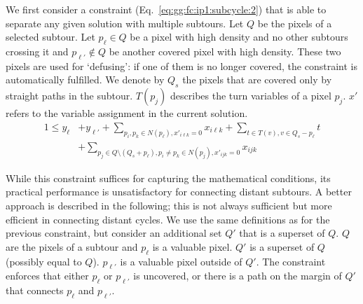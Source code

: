 We first consider a constraint (Eq.~\ref{eq:gg:fc:ip1:subcycle:2}) that is able to separate any given solution with multiple subtours.
Let $Q$ be the pixels of a selected subtour. 
Let $p_\ell\in Q$ be a pixel with high density and no other subtours crossing it
and $p_{\ell'}\not\in Q$ be another covered pixel with high density.
These two pixels are used for `defusing': if one of them is no longer covered, the constraint is automatically fulfilled.
We denote by $Q_s$ the pixels that are covered only by straight paths in the subtour.
$T(p_j)$ describes the turn variables of a pixel $p_j$.
$x'$ refers to the variable assignment in the current solution.
\begin{align}
	1 \leq y_{\ell} &+y_{\ell'}+\sum_{p_i,p_k\in N(p_\ell), x'_{i\ell k}=0} x_{i\ell k}  + \sum_{t\in T(v), v\in Q_s-p_\ell} t \nonumber \\
	   & + \sum_{ p_j\in Q\setminus (Q_s+p_\ell), p_i\not=p_k\in N(p_j), x'_{ijk}=0} x_{ijk} \label{eq:gg:fc:ip1:subcycle:2}
\end{align}


While this constraint suffices for capturing the mathematical conditions, its practical performance is unsatisfactory
for connecting distant subtours. A better approach is described in the following;
this is not always sufficient but more efficient in connecting distant cycles. 
We use the same definitions as for the previous constraint, but consider an additional set $Q'$ that is a superset of $Q$.
$Q$ are the pixels of a subtour and $p_{\ell}$ is a valuable pixel. $Q'$ is a superset of $Q$ (possibly equal to $Q$). $p_{\ell'}$ is a valuable
pixel outside of $Q'$. 
The constraint enforces that either $p_{\ell}$ or $p_{\ell'}$ is uncovered, or there is a path on 
the margin of $Q'$ that connects $p_{\ell}$ and $p_{\ell'}$.


